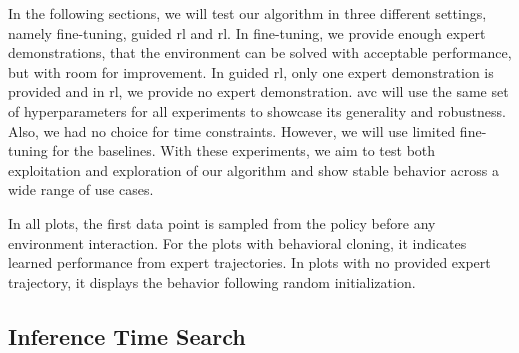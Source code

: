 In the following sections, we will test our algorithm in three different settings, namely fine-tuning, guided \ac{rl} and \ac{rl}. In fine-tuning, we provide
enough expert demonstrations, that the environment can be solved with acceptable performance, but with room for improvement. In guided \ac{rl},
only one expert demonstration is provided and in \ac{rl}, we provide no expert demonstration. \ac{avc} will use the same set of hyperparameters for all experiments to showcase its generality and robustness. Also, we had no choice for time constraints.
However, we will use limited fine-tuning for the baselines.
With these experiments, we aim to test both exploitation and exploration of our algorithm and show stable
behavior across a wide range of use cases.

In all plots, the first data point is sampled from the policy before any environment interaction. For the plots with behavioral cloning, it indicates learned performance from expert trajectories.
In plots with no provided expert trajectory, it displays the behavior following random initialization.

\subsection{Inference Time Search}
\label{ref:com_opt_modes}

